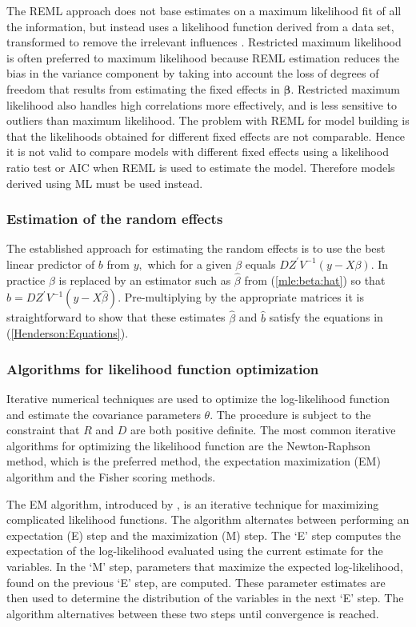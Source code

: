 \documentclass[12pt, a4paper]{report}
\theoremstyle{plain}
\theoremstyle{definition}
\theoremstyle{remark}
\begin{document}
	The REML approach does not base estimates on a maximum likelihood fit of all the information, but instead uses a likelihood function derived from a data set, transformed to remove the irrelevant influences \citep{REMLDefine}.
	Restricted maximum likelihood is often preferred to maximum likelihood because REML estimation reduces the bias in the variance component by taking into account the loss of degrees of freedom that results
	from estimating the fixed effects in $\boldsymbol{\beta}$. Restricted maximum likelihood also handles high correlations more effectively, and is less sensitive to outliers than maximum likelihood.  The problem with REML for model building is that the likelihoods obtained for different fixed effects are not comparable. Hence it is not valid to compare models with different fixed effects using a likelihood ratio test or AIC when REML is used to
	estimate the model. Therefore models derived using ML must be used instead.
	
	\subsubsection{Estimation of the random effects}
	
	The established approach for estimating the random effects is to use the best linear predictor of $b$ from $y,$ which for a given $\beta$ equals $DZ^\prime V^{-1}(y - X \beta).$ In practice $\beta$ is replaced by an estimator such as $\hat{\beta}$ from (\ref{mle:beta:hat}) so that $\hat{b} = DZ^\prime V^{-1}(y - X \hat{\beta}).$ Pre-multiplying by the appropriate matrices it is straightforward to show that these estimates $\hat{\beta}$ and $\hat{b}$ satisfy the equations in (\ref{Henderson:Equations}).
	
	\subsubsection{Algorithms for likelihood function optimization}Iterative numerical techniques are used to optimize the log-likelihood function and estimate the covariance parameters $\theta$. The procedure is subject to the constraint that $R$ and $D$ are both positive definite. The most common iterative algorithms for optimizing the likelihood function are the Newton-Raphson method, which is the preferred method, the expectation maximization (EM) algorithm and the Fisher scoring methods.
	
	The EM algorithm, introduced by \citet{EM}, is an iterative technique for maximizing complicated likelihood functions. The algorithm alternates between performing an expectation (E) step
	and the maximization (M) step. The `E' step computes the expectation of the log-likelihood evaluated using the current
	estimate for the variables. In the `M' step, parameters that maximize the expected log-likelihood, found on the previous `E' step, are computed. These parameter estimates are then used to determine the distribution of the variables in the next `E' step. The algorithm alternatives between these two steps until convergence is reached.
	
\end{document}
